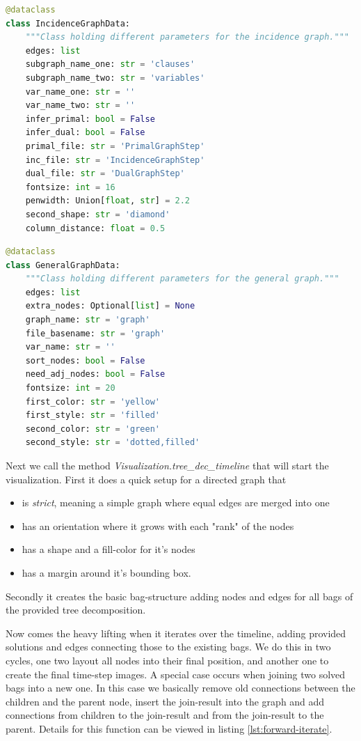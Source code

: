 \documentclass[a4paper, 12pt]{scrartcl}
\begin{document}
\begin{lstlisting}[language={Python}, caption={IncidenceGraphData}, label={lst:incidencedata}]
@dataclass
class IncidenceGraphData:
	"""Class holding different parameters for the incidence graph."""
	edges: list
	subgraph_name_one: str = 'clauses'
	subgraph_name_two: str = 'variables'
	var_name_one: str = ''
	var_name_two: str = ''
	infer_primal: bool = False
	infer_dual: bool = False
	primal_file: str = 'PrimalGraphStep'
	inc_file: str = 'IncidenceGraphStep'
	dual_file: str = 'DualGraphStep'
	fontsize: int = 16
	penwidth: Union[float, str] = 2.2
	second_shape: str = 'diamond'
	column_distance: float = 0.5	
\end{lstlisting}

\begin{lstlisting}[language={Python}, caption={GeneralGraphData}, label={lst:gengraphdata}]
@dataclass
class GeneralGraphData:
	"""Class holding different parameters for the general graph."""
	edges: list
	extra_nodes: Optional[list] = None
	graph_name: str = 'graph'
	file_basename: str = 'graph'
	var_name: str = ''
	sort_nodes: bool = False
	need_adj_nodes: bool = False
	fontsize: int = 20
	first_color: str = 'yellow'
	first_style: str = 'filled'
	second_color: str = 'green'
	second_style: str = 'dotted,filled'
\end{lstlisting}

Next we call the method \textit{Visualization.tree\_dec\_timeline} that will start the visualization.
First it does a quick setup for a directed graph that 
\begin{itemize}
	\item is \textit{strict}, meaning a simple graph where equal edges are merged into one
	\item has an orientation where it grows with each "rank" of the nodes
	\item has a shape and a fill-color for it's nodes
	\item has a margin around it's bounding box.
\end{itemize}

Secondly it creates the basic bag-structure adding nodes and edges for all bags of the provided tree decomposition.

Now comes the heavy lifting when it iterates over the timeline, adding provided solutions and edges connecting those to the existing bags. We do this in two cycles, one two layout all nodes into their final position, and another one to create the final time-step images. A special case occurs when joining two solved bags into a new one.
In this case we basically remove old connections between the children and the parent node, insert the join-result into the graph and add connections from children to the join-result and from the join-result to the parent. Details for this function can be viewed in listing \ref{lst:forward-iterate}.
 
\end{document}
